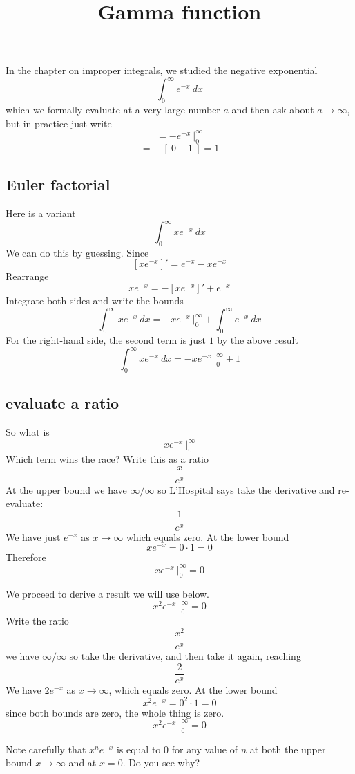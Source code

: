 \documentclass[11pt, oneside]{article}
\title{Gamma function}
\date{}
\begin{document}
\maketitle
\Large


In the chapter on improper integrals, we studied the negative exponential
\[ \int_0^{\infty} e^{-x} \ dx \]
which we formally evaluate at a very large number $a$ and then ask about $a \rightarrow \infty$, but in practice just write
\[ = -e^{-x} \ \bigg |_0^{\infty} \]
\[ = - \ [ \ 0 - 1 \ ] = 1 \]

\subsection*{Euler factorial}

Here is a variant
\[ \int_0^{\infty} x e^{-x} \ dx \]
We can do this by guessing.  Since
\[ [x e^{-x} ]' = e^{-x} - x e^{-x} \]
Rearrange
\[  x e^{-x} = - [x e^{-x} ]' + e^{-x} \]
Integrate both sides and write the bounds
\[ \int_0^{\infty} x e^{-x} \ dx = - x e^{-x} \ \bigg |_0^{\infty} +  \int_0^{\infty} e^{-x} \ dx  \]
For the right-hand side, the second term is just $1$ by the above result
\[ \int_0^{\infty} x e^{-x} \ dx = - x e^{-x} \ \bigg |_0^{\infty} +  1  \]

\subsection*{evaluate a ratio}
So what is
\[ x e^{-x} \ \bigg |_0^{\infty} \]
Which term wins the race?  Write this as a ratio
\[ \frac{x}{e^{x}} \]
At the upper bound we have $\infty/\infty$ so L'Hospital says take the derivative and re-evaluate:
\[ \frac{1}{e^{x}} \]
We have just $e^{-x}$ as $x \rightarrow \infty$ which equals zero.  
At the lower bound
\[ x e^{-x}  = 0 \cdot 1 = 0 \]
Therefore 
\[ x e^{-x} \ \bigg |_0^{\infty} = 0 \]

We proceed to derive a result we will use below.
\[ x^2 e^{-x} \ \bigg |_0^{\infty} = 0 \]
Write the ratio
\[ \frac{x^2}{e^x} \]
we have $\infty/\infty$ so take the derivative, and then take it again, reaching
\[ \frac{2}{e^{x}} \]
We have $2e^{-x}$ as $x \rightarrow \infty$, which equals zero.  
At the lower bound
\[ x^2 e^{-x}  = 0^2 \cdot 1 = 0 \]
since both bounds are zero, the whole thing is zero.
\[ x^2 e^{-x} \ \bigg |_0^{\infty} = 0  \]

Note carefully that $x^n e^{-x}$ is equal to $0$ for any value of $n$ at both the upper bound $x \rightarrow {\infty}$ and at $x = 0$.  Do you see why?
\end{document}
